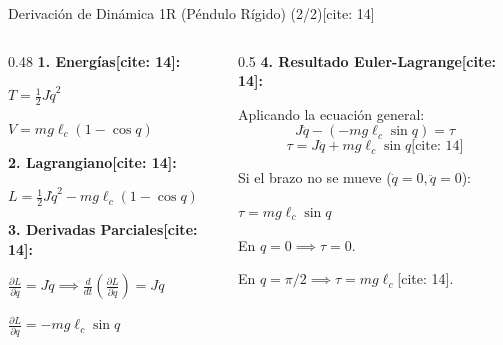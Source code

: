 \documentclass[aspectratio=169, xcolor={table,xcdraw}]{beamer}
\begin{document}
\begin{frame}{Derivación de Dinámica 1R (Péndulo Rígido) (2/2)[cite: 14]}
    \begin{columns}[T]
        \begin{column}{0.48\textwidth}
            \textbf{1. Energías[cite: 14]:}
            
            $T = \frac{1}{2}J\dot{q}^2$
            
            $V = mg\ell_c(1 - \cos q)$
            
            \vspace{0.3cm}
            \textbf{2. Lagrangiano[cite: 14]:}
            
            $L = \frac{1}{2}J\dot{q}^2 - mg\ell_c(1 - \cos q)$
            
            \vspace{0.3cm}
            \textbf{3. Derivadas Parciales[cite: 14]:}
            
            $\frac{\partial L}{\partial \dot{q}} = J\dot{q} \implies \frac{d}{dt}\left(\frac{\partial L}{\partial \dot{q}}\right) = J\ddot{q}$
            
            $\frac{\partial L}{\partial q} = -mg\ell_c\sin q$
        \end{column}
        \begin{column}{0.5\textwidth}
            \textbf{4. Resultado Euler-Lagrange[cite: 14]:}
            
            Aplicando la ecuación general:
            \begin{equation*}
                J\ddot{q} - (-mg\ell_c\sin q) = \tau
            \end{equation*}
            \begin{equation*}
                \boxed{\tau = J\ddot{q} + mg\ell_c\sin q} \text{[cite: 14]}
            \end{equation*}
            
            \vspace{0.2cm}
            \begin{tcolorbox}[colback=yellow!10, colframe=orange, title=Comprobación Estática]
                \small Si el brazo no se mueve ($\dot{q}=0, \ddot{q}=0$):
                
                $\tau = mg\ell_c\sin q$
                
                En $q=0 \implies \tau=0$.
                
                En $q=\pi/2 \implies \tau=mg\ell_c$[cite: 14].
            \end{tcolorbox}
        \end{column}
    \end{columns}
\end{frame}
\end{document}
